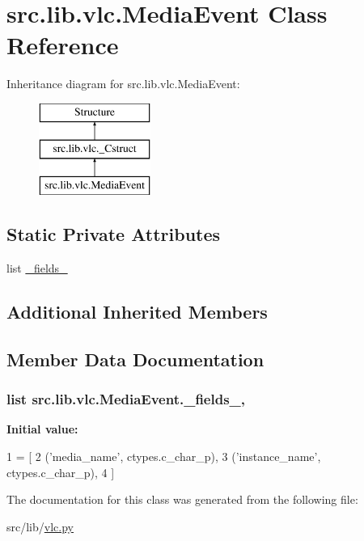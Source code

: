 \hypertarget{classsrc_1_1lib_1_1vlc_1_1MediaEvent}{}\section{src.\+lib.\+vlc.\+Media\+Event Class Reference}
\label{classsrc_1_1lib_1_1vlc_1_1MediaEvent}
Inheritance diagram for src.\+lib.\+vlc.\+Media\+Event\+:\begin{figure}[H]
\begin{center}
\leavevmode
\includegraphics[height=3.000000cm]{classsrc_1_1lib_1_1vlc_1_1MediaEvent}
\end{center}
\end{figure}
\subsection*{Static Private Attributes}
\begin{DoxyCompactItemize}
\item 
list \hyperlink{classsrc_1_1lib_1_1vlc_1_1MediaEvent_a252ea3d8299aec9074ab50a2b86accf3}{\+\_\+fields\+\_\+}
\end{DoxyCompactItemize}
\subsection*{Additional Inherited Members}


\subsection{Member Data Documentation}
\hypertarget{classsrc_1_1lib_1_1vlc_1_1MediaEvent_a252ea3d8299aec9074ab50a2b86accf3}{}
\subsubsection[{\+\_\+fields\+\_\+}]{\setlength{\rightskip}{0pt plus 5cm}list src.\+lib.\+vlc.\+Media\+Event.\+\_\+fields\+\_\+\hspace{0.3cm}{\ttfamily [static]}, {\ttfamily [private]}}\label{classsrc_1_1lib_1_1vlc_1_1MediaEvent_a252ea3d8299aec9074ab50a2b86accf3}
{\bfseries Initial value\+:}
\begin{DoxyCode}
1 = [
2         (\textcolor{stringliteral}{'media\_name'},    ctypes.c\_char\_p),
3         (\textcolor{stringliteral}{'instance\_name'}, ctypes.c\_char\_p),
4     ]
\end{DoxyCode}


The documentation for this class was generated from the following file\+:\begin{DoxyCompactItemize}
\item 
src/lib/\hyperlink{vlc_8py}{vlc.\+py}\end{DoxyCompactItemize}
